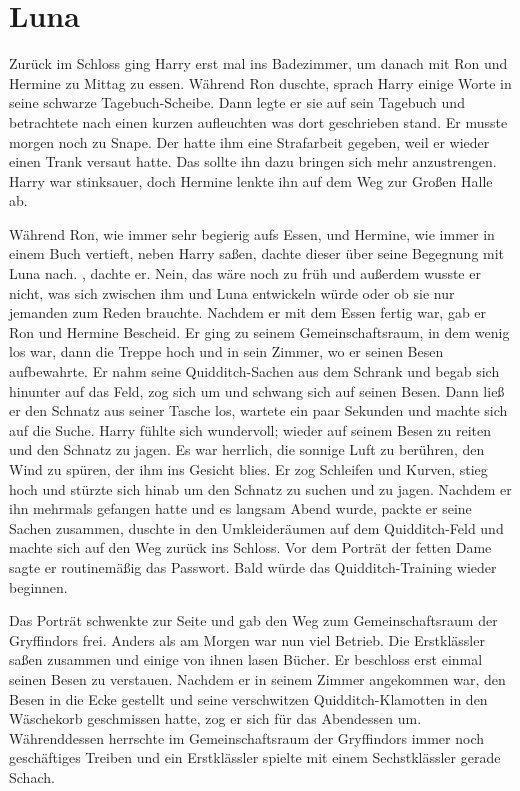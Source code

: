 \chapter{Luna}


Zurück im Schloss ging Harry erst mal ins Badezimmer, um danach mit Ron und Hermine zu Mittag zu essen. Während Ron duschte, sprach Harry einige Worte in seine schwarze Tagebuch-Scheibe. Dann legte er sie auf sein Tagebuch und betrachtete nach einen kurzen aufleuchten was dort geschrieben stand. Er musste morgen noch zu Snape. Der hatte ihm eine Strafarbeit gegeben, weil er wieder einen Trank versaut hatte. Das sollte ihn dazu bringen sich mehr anzustrengen. Harry war stinksauer, doch Hermine lenkte ihn auf dem Weg zur Großen Halle ab.

Während Ron, wie immer sehr begierig aufs Essen, und Hermine, wie immer in einem Buch vertieft, neben Harry saßen, dachte dieser über seine Begegnung mit Luna nach. , dachte er. Nein, das wäre noch zu früh und außerdem wusste er nicht, was sich zwischen ihm und Luna entwickeln würde oder ob sie nur jemanden zum Reden brauchte. Nachdem er mit dem Essen fertig war, gab er Ron und Hermine Bescheid. Er ging zu seinem Gemeinschaftsraum, in dem wenig los war, dann die Treppe hoch und in sein Zimmer, wo er seinen Besen aufbewahrte. Er nahm seine Quidditch-Sachen aus dem Schrank und begab sich hinunter auf das Feld, zog sich um und schwang sich auf seinen Besen. Dann ließ er den Schnatz aus seiner Tasche los, wartete ein paar Sekunden und machte sich auf die Suche. Harry fühlte sich wundervoll; wieder auf seinem Besen zu reiten und den Schnatz zu jagen. Es war herrlich, die sonnige Luft zu berühren, den Wind zu spüren, der ihm ins Gesicht blies. Er zog Schleifen und Kurven, stieg hoch und stürzte sich hinab um den Schnatz zu suchen und zu jagen. Nachdem er ihn mehrmals gefangen hatte und es langsam Abend wurde, packte er seine Sachen zusammen, duschte in den Umkleideräumen auf dem Quidditch-Feld und machte sich auf den Weg zurück ins Schloss. Vor dem Porträt der fetten Dame sagte er routinemäßig das Passwort. Bald würde das Quidditch-Training wieder beginnen.

Das Porträt schwenkte zur Seite und gab den Weg zum Gemeinschaftsraum der Gryffindors frei. Anders als am Morgen war nun viel Betrieb. Die Erstklässler saßen zusammen und einige von ihnen lasen Bücher. Er beschloss erst einmal seinen Besen zu verstauen. Nachdem er in seinem Zimmer angekommen war, den Besen in die Ecke gestellt und seine verschwitzen Quidditch-Klamotten in den Wäschekorb geschmissen hatte, zog er sich für das Abendessen um. Währenddessen herrschte im Gemeinschaftsraum der Gryffindors immer noch geschäftiges Treiben und ein Erstklässler spielte mit einem Sechstklässler gerade Schach.


